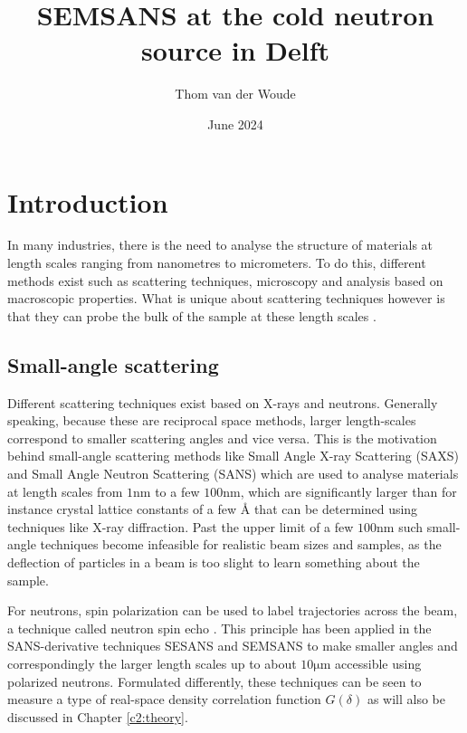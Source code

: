 \documentclass{article}
\title{SEMSANS at the cold neutron source in Delft}
\author{Thom van der Woude}
\date{June 2024}
\begin{document}
\maketitle

\section{Introduction}
\label{c1:introduction}
In many industries, there is the need to analyse the structure of materials at length scales ranging from nanometres to micrometers. To do this, different methods exist such as scattering techniques, microscopy and analysis based on macroscopic properties. What is unique about scattering techniques however is that they can probe the bulk of the sample at these length scales \cite{bouwman2021}.


\subsection{Small-angle scattering}
\label{c1.1}
Different scattering techniques exist based on X-rays and neutrons. Generally speaking, because these are reciprocal space methods, larger length-scales correspond to smaller scattering angles and vice versa. This is the motivation behind small-angle scattering methods like Small Angle X-ray Scattering (SAXS) and Small Angle Neutron Scattering (SANS) which are used to analyse materials at length scales from $1 \unit{\nano\meter}$ to a few $100 \unit{\nano\meter}$, which are significantly larger than for instance crystal lattice constants of a few $\unit{Å}$ that can be determined using techniques like X-ray diffraction. Past the upper limit of a few $100 \unit{\nano\meter}$ such small-angle techniques become infeasible for realistic beam sizes and samples, as the deflection of particles in a beam is too slight to learn something about the sample.

For neutrons, spin polarization can be used to label trajectories across the beam, a technique called neutron spin echo \cite{mezei1972}. This principle has been applied in the SANS-derivative techniques SESANS \cite{rekveldt1996} and SEMSANS \cite{bouwman2009}\cite{bouwman2011} to make smaller angles and correspondingly the larger length scales up to about $10 \unit{\micro\meter}$ accessible using polarized neutrons. Formulated differently, these techniques can be seen to measure a type of real-space density correlation function $G(\delta)$ \cite{krouglov2003}\cite{andersson2008} as will also be discussed in Chapter \ref{c2:theory}.
\end{document}
